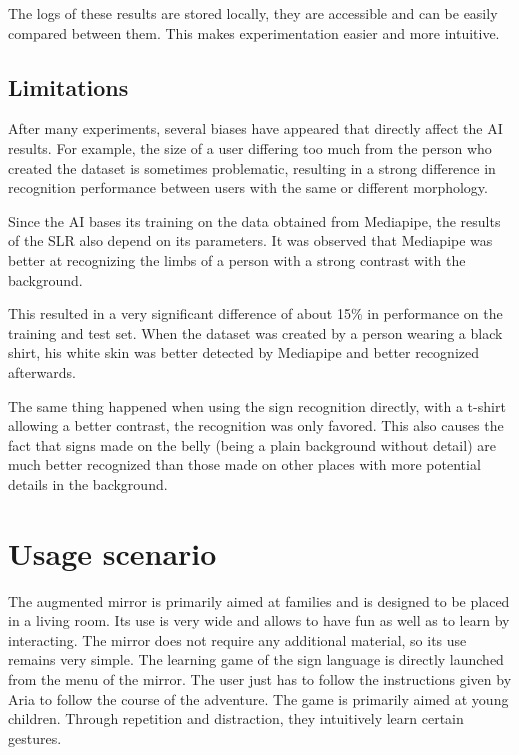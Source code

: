 The logs of these results are stored locally, they are accessible and can be easily compared between them. This makes experimentation easier and more intuitive.

\subsection{Limitations}

After many experiments, several biases have appeared that directly affect the AI results. For example, the size of a user differing too much from the person who created the dataset is sometimes problematic, resulting in a strong difference in recognition performance between users with the same or different morphology. 

Since the AI bases its training on the data obtained from Mediapipe, the results of the SLR also depend on its parameters. It was observed that Mediapipe was better at recognizing the limbs of a person with a strong contrast with the background. 

This resulted in a very significant difference of about 15\% in performance on the training and test set. When the dataset was created by a person wearing a black shirt, his white skin was better detected by Mediapipe and better recognized afterwards. 

The same thing happened when using the sign recognition directly, with a t-shirt allowing a better contrast, the recognition was only favored. This also causes the fact that signs made on the belly (being a plain background without detail) are much better recognized than those made on other places with more potential details in the background.

\section{Usage scenario}

The augmented mirror is primarily aimed at families and is designed to be placed in a living room. Its use is very wide and allows to have fun as well as to learn by interacting.
The mirror does not require any additional material, so its use remains very simple.
The learning game of the sign language is directly launched from the menu of the mirror. The user just has to follow the instructions given by Aria to follow the course of the adventure. The game is primarily aimed at young children. Through repetition and distraction, they intuitively learn certain gestures.

